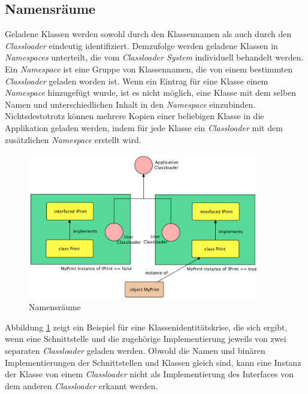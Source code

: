 \subsection{Namensräume}
Geladene Klassen werden sowohl durch den Klassennamen als auch durch den \textit{Classloader} eindeutig identifiziert. Demzufolge werden geladene Klassen in \textit{Namespaces} unterteilt, die vom \textit{Classloader System} individuell behandelt werden.
\newline
Ein \textit{Namespace} ist eine Gruppe von Klassennamen, die von einem bestimmten \textit{Classloader} geladen worden ist. Wenn ein Eintrag für eine Klasse einem \textit{Namespace} hinzugefügt wurde, ist es nicht möglich, eine Klasse mit dem selben Namen und unterschiedlichen Inhalt in den \textit{Namespace} einzubinden. 
\newline
Nichtsdestotrotz können mehrere Kopien einer beliebigen Klasse in die Applikation geladen werden, indem für jede Klasse ein \textit{Classloader} mit dem zusätzlichen \textit{Namespace} erstellt wird. 
\begin{figure}[h]
  \centering
  \includegraphics[width=0.9\textwidth]{material/images/namespaces.png}
  \caption{Namensräume}
  \label{fig:namespaces}
\end{figure}
\newline
Abbildung \ref{fig:namespaces} zeigt ein Beispiel für eine Klassenidentitätskrise, die sich ergibt, wenn eine Schnittstelle und die zugehörige Implementierung jeweils von zwei separaten \textit{Classloader} geladen werden. Obwohl die Namen und binären Implementierungen der Schnittstellen und Klassen gleich sind, kann eine Instanz der Klasse von einem \textit{Classloader} nicht als Implementierung des Interfaces von dem anderen \textit{Classloader} erkannt werden. \newline 
